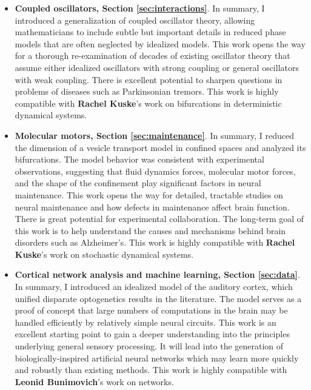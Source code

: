 \documentclass[a4paper,11pt]{article}
\begin{document}
\begin{itemize}
	\item \textbf{Coupled oscillators, Section \ref{sec:interactions}}. In summary, I introduced a generalization of coupled oscillator theory, allowing mathematicians to include subtle but important details in reduced phase models that are often neglected by idealized models. This work opens the way for a thorough re-examination of decades of existing oscillator theory that assume either idealized oscillators with strong coupling or general oscillators with weak coupling. There is excellent potential to sharpen questions in problems of diseases such as Parkinsonian tremors. This work is highly compatible with \textbf{Rachel Kuske}'s work on bifurcations in deterministic dynamical systems.
	\item \textbf{Molecular motors, Section \ref{sec:maintenance}}. In summary, I reduced the dimension of a vesicle transport model in confined spaces and analyzed its bifurcations. The model behavior was consistent with experimental observations, suggesting that fluid dynamics forces, molecular motor forces, and the shape of the confinement play significant factors in neural maintenance. This work opens the way for detailed, tractable studies on neural maintenance and how defects in maintenance affect brain function. There is great potential for experimental collaboration. The long-term goal of this work is to help understand the causes and mechanisms behind  brain disorders such as Alzheimer's. This work is highly compatible with \textbf{Rachel Kuske}'s work on stochastic dynamical systems.
	\item \textbf{Cortical network analysis and machine learning, Section \ref{sec:data}}. In summary, I introduced an idealized model of the auditory cortex, which unified disparate optogenetics results in the literature. The model serves as a proof of concept that large numbers of computations in the brain may be handled efficiently by relatively simple neural circuits. This work is an excellent starting point to gain a deeper understanding into the principles underlying general sensory processing. It will lead into the generation of biologically-inspired artificial neural networks which may learn more quickly and robustly than existing methods. This work is highly compatible with \textbf{Leonid Bunimovich}'s work on networks.
\end{itemize}


\end{document}
